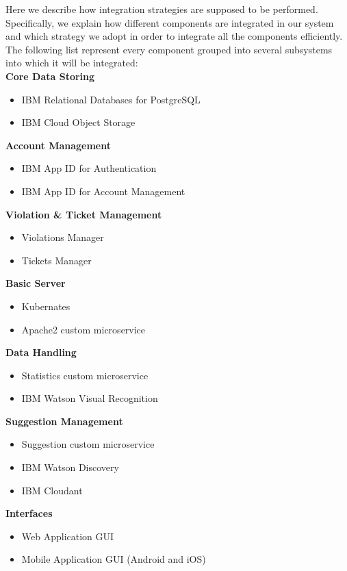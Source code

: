 Here we describe how integration strategies are supposed to be performed. Specifically, we explain how different components are integrated in our system and which strategy we adopt in order to integrate all the components efficiently.
\\The following list represent every component grouped into several subsystems into which it will be integrated:
\\[0.5cm]
\textbf{Core Data Storing}
\begin{itemize}
\item IBM Relational Databases for PostgreSQL
\item IBM Cloud Object Storage
\end{itemize}

\textbf{Account Management}
\begin{itemize}
	\item IBM App ID for Authentication
	\item IBM App ID for Account Management
\end{itemize}

\textbf{Violation \& Ticket Management}
\begin{itemize}
  \item Violations Manager
  \item Tickets Manager
\end{itemize}

\textbf{Basic Server}
\begin{itemize}
	\item Kubernates
    \item Apache2 custom microservice
\end{itemize}

\textbf{Data Handling}
\begin{itemize}
	\item Statistics custom microservice
	\item IBM Watson Visual Recognition
\end{itemize}

\textbf{Suggestion Management}
\begin{itemize}
	\item Suggestion custom microservice
	\item IBM Watson Discovery
	\item IBM Cloudant
\end{itemize}

\textbf{Interfaces}
\begin{itemize}
	\item Web Application GUI
	\item Mobile Application GUI (Android and iOS)
\end{itemize}